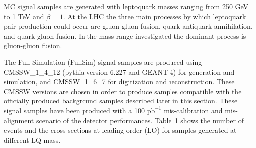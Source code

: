 \documentclass[colclass=cmspaper]{combine}
\begin{document}
\begin{linenumbers}

MC signal samples are generated with leptoquark masses ranging from 250 GeV to 1 TeV and $\beta=1$. 
At the LHC the three main processes by which leptoquark pair production could occur are gluon-gluon fusion, 
quark-antiquark annihilation, and quark-gluon fusion. In the mass range investigated the dominant process is gluon-gluon fusion. 

The Full Simulation (FullSim) signal samples are produced using 
CMSSW\_1\_4\_12 (pythia version 6.227 and GEANT 4) 
for generation and simulation, and CMSSW\_1\_6\_7  for digitization and reconstruction. 
These CMSSW versions are chosen in order to produce samples
compatible with the officially produced background samples described later in this section. 
These signal samples have been produced with a 100 $\mbox{pb}^{-1}$ mis-calibration and mis-alignment 
scenario of the detector performances. Table~1
shows the number of events and the cross sections at leading order (LO) for samples generated at different LQ mass.


\end{linenumbers}
\end{document}
